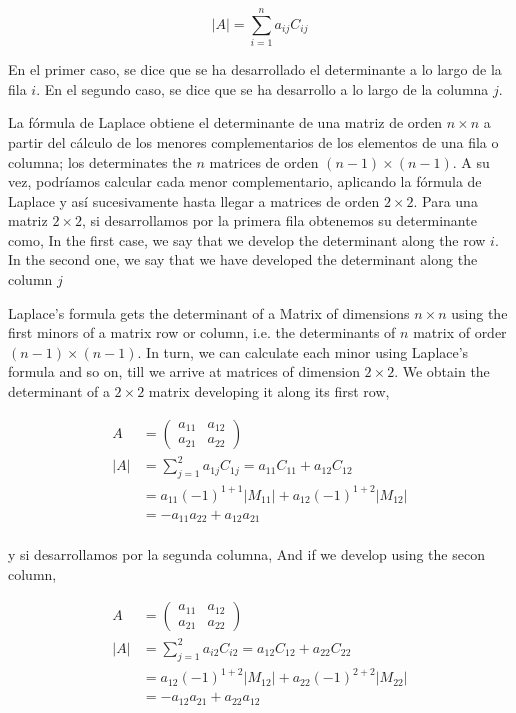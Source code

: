 \begin{equation*}
\vert A \vert = \sum_{i=1}^n a_{ij}C_{ij}
\end{equation*}
\begin{paracol}{2}
En el primer caso, se dice que se ha desarrollado el determinante a lo largo de la fila $i$. En el segundo caso, se dice que se ha desarrollo a lo largo de la columna $j$.

 La fórmula de Laplace obtiene el determinante de una matriz de orden $n\times n$ a partir del cálculo de los menores complementarios de los elementos de una fila o columna; los determinates the $n$ matrices de orden $(n-1)\times (n-1)$. A su vez, podríamos calcular cada menor complementario, aplicando la fórmula de Laplace y así sucesivamente hasta llegar a matrices de orden $2\times 2$. Para una matriz $2\times 2$, si desarrollamos por la primera fila obtenemos su determinante como,
\switchcolumn
In the first case, we say that we develop the determinant along the row $i$. In the second one, we say that we have developed the determinant along the column $j$

Laplace's formula gets the determinant of a Matrix of dimensions $n\times n$ using the first minors of a matrix row or column, i.e. the determinants of $n$ matrix of order $(n-1)\times (n-1)$. In turn, we can calculate each minor using Laplace's formula and so on, till we arrive at matrices of dimension $2\times 2$. We obtain the determinant of a $2\times 2$ matrix developing it along its first row,      

\end{paracol}

\begin{align*}
A&=\begin{pmatrix}
a_{11}& a_{12}\\
a_{21}& a_{22}
\end{pmatrix}\\
\vert A \vert & =\sum_{j=1}^2a_{1j}C_{1j} =a_{11}C_{11}+a_{12}C_{12}\\
 &=a_{11}(-1)^{1+1}\vert M_{11}\vert +a_{12}(-1)^{1+2}\vert M_{12}\vert \\
 &=-a_{11}a_{22}+a_{12}a_{21}\\
\end{align*}

\begin{paracol}{2}
y si desarrollamos por la segunda columna,
\switchcolumn
And if  we develop using the secon column,
\end{paracol}
\begin{align*}
A&=\begin{pmatrix}
a_{11}& a_{12}\\
a_{21}& a_{22}
\end{pmatrix}\\
\vert A \vert & =\sum_{j=1}^2a_{i2}C_{i2} =a_{12}C_{12}+a_{22}C_{22}\\
 &=a_{12}(-1)^{1+2}\vert M_{12}\vert +a_{22}(-1)^{2+2}\vert M_{22}\vert \\
 &=-a_{12}a_{21}+a_{22}a_{12}\\
\end{align*}

